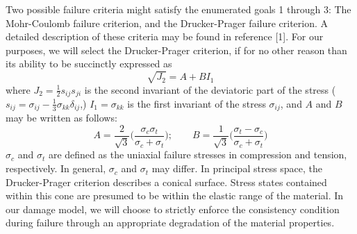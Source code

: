 \documentclass[11pt]{article} %
\begin{document}
Two possible failure criteria might satisfy the enumerated goals 1 through 3: The Mohr-Coulomb failure criterion, and the Drucker-Prager failure criterion. A detailed description of these criteria may be found in reference [1].  For our purposes, we will select the Drucker-Prager criterion, if for no other reason than its ability to be succinctly expressed as
\begin{equation}
	\sqrt{J_2} = A + B I_1
\end{equation}
where $J_2 = \frac{1}{2} s_{ij} s_{ji}$ is the second invariant of the deviatoric part of the stress ($s_{ij} = \sigma_{ij} - \frac{1}{3} \sigma_{kk} \delta_{ij}$,) $I_1 = \sigma_{kk}$ is the first invariant of the stress $\sigma_{ij}$, and $A$ and $B$ may be written as follows:
\begin{equation}
	A = \frac{2}{\sqrt{3}} \bigg( \frac{\sigma_c \sigma_t}{\sigma_c + \sigma_t} \bigg); \qquad B = \frac{1}{\sqrt{3}} \bigg( \frac{\sigma_t - \sigma_c}{\sigma_c + \sigma_t} \bigg)
\end{equation}
$\sigma_c$ and $\sigma_t$ are defined as the uniaxial failure stresses in compression and tension, respectively. In general, $\sigma_c$ and $\sigma_t$ may differ. In principal stress space, the Drucker-Prager criterion describes a conical surface. Stress states contained within this cone are presumed to be within the elastic range of the material. In our damage model, we will choose to strictly enforce the consistency condition during failure through an appropriate degradation of the material properties.
\end{document}
